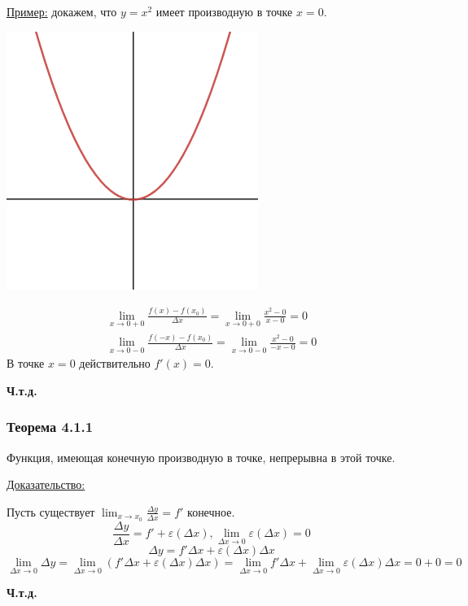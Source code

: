 \documentclass[12pt]{article}
\begin{document}
    \underline{Пример:} докажем, что $y = x^2$ имеет производную в точке $x=0$.
    \begin{adjustwidth}{1.5em}{1.5em}
        \begin{center}
            \includegraphics{4.1.2.png}
        \end{center}
        \begin{gather*}
            \lim_{x \to 0+0}\frac{f(x) - f(x_0)}{\Delta x} = \lim_{x\to 0+0} \frac{x^2 - 0}{x - 0} = 0\\
            \lim_{x \to 0-0}\frac{f(-x) - f(x_0)}{\Delta x} = \lim_{x\to 0-0} \frac{x^2 - 0}{-x-0} = 0
        \end{gather*}
        В точке $x = 0$ действительно $f'(x) = 0$.
        \begin{center}
            \textbf{Ч.т.д.}
        \end{center}
    \end{adjustwidth}
    
    \subsubsection*{Теорема 4.1.1}\label{th:4.1.1}
    Функция, имеющая конечную производную в точке, непрерывна в этой точке.\par\noindent
    \underline{Доказательство:}
    \begin{adjustwidth}{1.5em}{1.5em}
        Пусть существует $\lim_{x\to x_0} \frac{\Delta y}{\Delta x} = f'$ конечное.
        \[ \frac{\Delta y}{\Delta x} = f' + \varepsilon(\Delta x), \lim_{\Delta x \to 0}\varepsilon(\Delta x) = 0 \]
        \[ \Delta y = f' \Delta x + \varepsilon(\Delta x)\Delta x \]
        \[ \lim_{\Delta x \to 0} \Delta y = \lim_{\Delta x \to 0} (f' \Delta x + \varepsilon(\Delta x)\Delta x) = \lim_{\Delta x \to 0} f'\Delta x + \lim_{\Delta x \to 0} \varepsilon(\Delta x)\Delta x = 0 + 0 = 0 \]
        \begin{center}
            \textbf{Ч.т.д.}
        \end{center}
    \end{adjustwidth}
\end{document}

